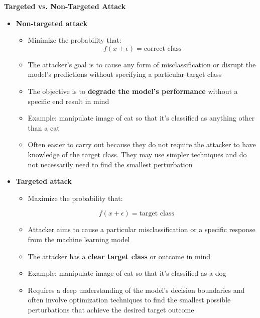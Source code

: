 \noindent
\textbf{Targeted vs. Non-Targeted Attack}
\begin{itemize}
    \item \textbf{Non-targeted attack}
    \begin{itemize}
        \item Minimize the probability that: 
\[f(x + \epsilon) = \text{correct class}\]
\item The attacker's goal is to cause any form of misclassification or disrupt the model's predictions without specifying a particular target class
\item The objective is to \textbf{degrade the model's performance} without a specific end result in mind
\item Example: manipulate image of cat so that it's classified as anything other than a cat
\item  Often easier to carry out because they do not require the attacker to have knowledge of the target class. They may use simpler techniques and do not necessarily need to find the smallest perturbation
\end{itemize}
\item \textbf{Targeted attack}
\begin{itemize}
    \item Maximize the probability that:

\end{itemize}
\[f(x + \epsilon) = \text{target class}\]
\begin{itemize}
    \item  Attacker aims to cause a particular misclassification or a specific response from the machine learning model
    \item The attacker has a \textbf{clear target class} or outcome in mind
    \item Example: manipulate image of cat so that it's classified as a dog
    \item Requires a deep understanding of the model's decision boundaries and often involve optimization techniques to find the smallest possible perturbations that achieve the desired target outcome
\end{itemize}
\end{itemize}

